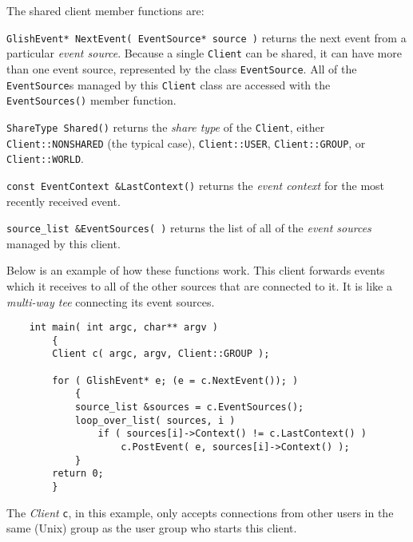 The shared client member functions are:
\begin{sloppy}
\begin{list}{}{}

\item[{\tt GlishEvent* NextEvent( EventSource* source )}] returns the next
event from a particular {\em event source}. Because a single {\tt Client}
can be shared, it can have more than one event source, represented by
the class {\tt EventSource}. All of the {\tt EventSource}s managed by
this {\tt Client} class are accessed with the {\tt EventSources()}
member function.

\item[{\tt ShareType Shared()}] returns
the {\em share type} of the {\tt Client}, either {\tt Client::NONSHARED}
(the typical case), {\tt Client::USER}, {\tt Client::GROUP}, or {\tt Client::WORLD}.

\item[{\tt const EventContext \&LastContext()}] returns the
{\em event context} for the most recently received event.

\item[{\tt source\_list \&EventSources( )}] returns
the list of all of the {\em event sources} managed by this client.
\end{list}
\end{sloppy}

Below is an example of how these functions work. This client forwards events
which it receives to all of the other sources that are connected to it. It is
like a {\em multi-way tee} connecting its event sources.
\label{shared-client-example}
\begin{verbatim}
    int main( int argc, char** argv )
        {
        Client c( argc, argv, Client::GROUP );

        for ( GlishEvent* e; (e = c.NextEvent()); )
            {
            source_list &sources = c.EventSources();
            loop_over_list( sources, i )
                if ( sources[i]->Context() != c.LastContext() )
                    c.PostEvent( e, sources[i]->Context() );
            }
        return 0;
        }
\end{verbatim}
The {\em Client} {\tt c}, in this example,  only accepts connections from other
users in the same ({\sc Unix}) group as the user group who starts this client.

